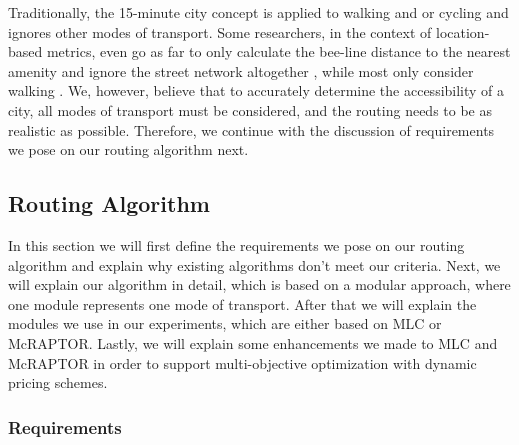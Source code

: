Traditionally, the 15-minute city concept is applied to walking and or cycling and ignores other modes of transport.
Some researchers, in the context of location-based metrics, even go as far to only calculate the bee-line distance to the nearest amenity and ignore the street network altogether , while most only consider walking .
We, however, believe that to accurately determine the accessibility of a city, all modes of transport must be considered, and the routing needs to be as realistic as possible.
Therefore, we continue with the discussion of requirements we pose on our routing algorithm next.


\subsection{Routing Algorithm}
\label{subs:routing_algorithm}

In this section we will first define the requirements we pose on our routing algorithm and explain why existing algorithms don't meet our criteria.
Next, we will explain our algorithm in detail, which is based on a modular approach, where one module represents one mode of transport.
After that we will explain the modules we use in our experiments, which are either based on MLC or McRAPTOR.
Lastly, we will explain some enhancements we made to MLC and McRAPTOR in order to support multi-objective optimization with dynamic pricing schemes.

\subsubsection{Requirements}
\label{subsubsec:requirements}


